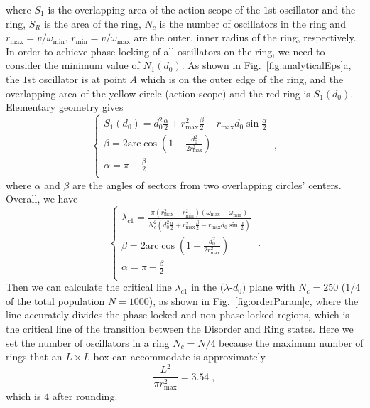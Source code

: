 \documentclass[%
 aip,
 amsmath,amssymb,
 reprint,%
]{revtex4-1}
\begin{document}
where $S_1$ is the overlapping area of the action scope of the $1$st oscillator and the ring, $S_R$ is the area of the ring, $N_c$ is the number of oscillators in the ring and $r_{\max}=v/\omega_{\min}$, $r_{\min}=v/\omega_{\max}$ are the outer, inner radius of the ring, respectively. In order to achieve phase locking of all oscillators on the ring, we need to consider the minimum value of $N_1\left( d_0\right)$. As shown in Fig.~\ref{fig:analyticalEps}a, the $1$st oscillator is at point $A$ which is on the outer edge of the ring, and the overlapping area of the yellow circle (action scope) and the red ring is $S_1\left( d_0 \right)$.  Elementary geometry gives 
\begin{equation}\label{eq:S1}
    \begin{cases}
        S_1\left( d_0 \right) =d_{0}^{2}\frac{\alpha}{2}+r_{\max}^{2}\frac{\beta}{2}-r_{\max}d_0\sin \frac{\alpha}{2}\\
        \beta =2\mathrm{arc}\cos \left( 1-\frac{d_{0}^{2}}{2r_{\max}^{2}} \right)\\
        \alpha =\pi -\frac{\beta}{2}\\
    \end{cases}\;,
\end{equation}
where $\alpha$ and $\beta$ are the angles of sectors from two overlapping circles' centers. Overall, we have
\begin{equation}
    \begin{cases}
        \lambda _{c1}=\frac{\pi \left( r_{\max}^{2}-r_{\min}^{2} \right) \left( \omega _{\max}-\omega _{\min} \right)}{N_{c}^{2}\left( d_{0}^{2}\frac{\alpha}{2}+r_{\max}^{2}\frac{\beta}{2}-r_{\max}d_0\sin \frac{\alpha}{2} \right)}\\
        \beta =2\mathrm{arc}\cos \left( 1-\frac{d_{0}^{2}}{2r_{\max}^{2}} \right)\\
        \alpha =\pi -\frac{\beta}{2}\\
    \end{cases}\;.
\end{equation}
Then we can calculate the critical line $\lambda_{c1}$ in the $(\lambda$-$d_0)$ plane with $N_c=250$ ($1/4$ of the total population $N=1000$), as shown in Fig.~\ref{fig:orderParam}c, where the line accurately divides the phase-locked and non-phase-locked regions, which is the critical line of the transition between the Disorder and Ring states. Here we set the number of oscillators in a ring $N_c=N/4$ because the maximum number of rings that an $L\times L$ box can accommodate is approximately
\begin{equation}
    \frac{L^2}{\pi r_{\max}^{2}}=3.54\;,
\end{equation}
which is $4$ after rounding.
\end{document}
